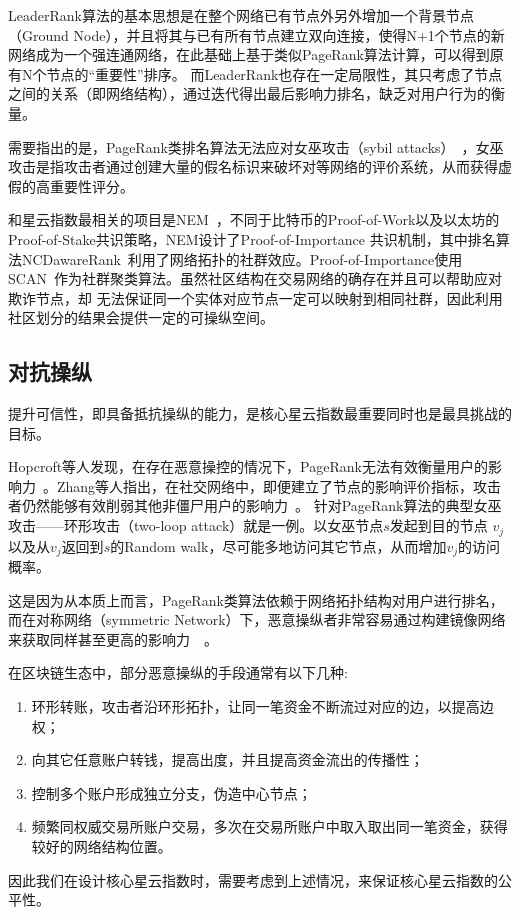 LeaderRank算法的基本思想是在整个网络已有节点外另外增加一个背景节点（Ground Node），并且将其与已有所有节点建立双向连接，使得N+1个节点的新网络成为一个强连通网络，在此基础上基于类似PageRank算法计算，可以得到原有N个节点的“重要性”排序。
而LeaderRank也存在一定局限性，其只考虑了节点之间的关系（即网络结构），通过迭代得出最后影响力排名，缺乏对用户行为的衡量。

需要指出的是，PageRank类排名算法无法应对女巫攻击（sybil attacks）~\cite{cheng2006manipulability}，女巫攻击是指攻击者通过创建大量的假名标识来破坏对等网络的评价系统，从而获得虚假的高重要性评分。


和星云指数最相关的项目是NEM~\cite{nem}，不同于比特币的Proof-of-Work以及以太坊的Proof-of-Stake共识策略，NEM设计了Proof-of-Importance 共识机制，其中排名算法NCDawareRank~\cite{Nikolakopoulos2013}利用了网络拓扑的社群效应。Proof-of-Importance使用SCAN~\cite{xu2007scan}\cite{shiokawa2015scan}\cite{chang2017mathsf}作为社群聚类算法。虽然社区结构在交易网络的确存在并且可以帮助应对欺诈节点，却 无法保证同一个实体对应节点一定可以映射到相同社群，因此利用社区划分的结果会提供一定的可操纵空间。


\subsection{对抗操纵}

提升可信性，即具备抵抗操纵的能力，是核心星云指数最重要同时也是最具挑战的目标。

Hopcroft等人发现，在存在恶意操控的情况下，PageRank无法有效衡量用户的影响力~\cite{hopcroft2007manipulation}。Zhang等人指出，在社交网络中，即便建立了节点的影响评价指标，攻击者仍然能够有效削弱其他非僵尸用户的影响力~\cite{zhang2016truetop}。
针对PageRank算法的典型女巫攻击——环形攻击（two-loop attack）就是一例。以女巫节点$s$发起到目的节点
$v_j$以及从$v_j$返回到$s$的Random walk，尽可能多地访问其它节点，从而增加$v_j$的访问概率。

这是因为从本质上而言，PageRank类算法依赖于网络拓扑结构对用户进行排名，而在对称网络（symmetric Network）下，恶意操纵者非常容易通过构建镜像网络来获取同样甚至更高的影响力~\cite{cheng2005sybilproof}~\cite{cheng2006manipulability}。


在区块链生态中，部分恶意操纵的手段通常有以下几种:
\begin{enumerate}
\item 环形转账，攻击者沿环形拓扑，让同一笔资金不断流过对应的边，以提高边权；
\item 向其它任意账户转钱，提高出度，并且提高资金流出的传播性；
\item 控制多个账户形成独立分支，伪造中心节点；
\item 频繁同权威交易所账户交易，多次在交易所账户中取入取出同一笔资金，获得较好的网络结构位置。
\end{enumerate}

因此我们在设计核心星云指数时，需要考虑到上述情况，来保证核心星云指数的公平性。




